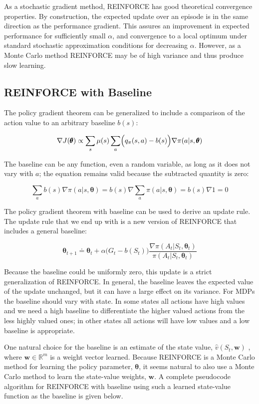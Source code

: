 \documentclass{article}
\begin{document}
As a stochastic gradient method, REINFORCE has good theoretical convergence properties. By construction, the expected update over an episode is in the same direction as the performance gradient. 
This assures an improvement in expected performance for sufficiently small $\alpha$, and convergence to a local optimum under standard stochastic approximation conditions for decreasing $\alpha$. 
However, as a Monte Carlo method REINFORCE may be of high variance and thus produce slow learning.

\subsection{REINFORCE with Baseline}

The policy gradient theorem can be generalized to include a comparison of the action value to an arbitrary baseline $b ( s )$:

$$
\nabla J ( \pmb { \theta } ) \propto \sum _ { s } \mu ( s ) \sum _ { a } \Bigl ( q _ { \pi } ( s , a ) - b ( s ) \Bigr ) \nabla \pi ( a | s , \pmb { \theta } )
$$

The baseline can be any function, even a random variable, as long as it does not vary with $a$; the equation remains valid because the subtracted quantity is zero:

$$
\sum _ { a } b ( s ) \nabla \pi ( a | s , \pmb { \theta } ) = b ( s ) \nabla \sum _ { a } \pi ( a | s , \pmb { \theta } ) = b ( s ) \nabla 1 = 0
$$

The policy gradient theorem with baseline can be used to derive an update rule. The update rule that we end up with is a new version of REINFORCE that includes a general baseline:

$$
\pmb { \theta } _ { t + 1 } \doteq \pmb { \theta } _ { t } + \alpha \Big ( G _ { t } - b ( S _ { t } ) \Big ) \frac { \nabla \pi ( A _ { t } | S _ { t } , \pmb { \theta } _ { t } ) } { \pi ( A _ { t } | S _ { t } , \pmb { \theta } _ { t } ) }
$$

Because the baseline could be uniformly zero, this update is a strict generalization of REINFORCE. In general, the baseline leaves the expected value of the update unchanged, but it can have a large effect on its variance. 
For MDPs the baseline should vary with state. In some states all actions have high values and we need a high baseline to differentiate the higher valued actions from the less highly valued ones; in other states all actions will have low values and a low baseline is appropriate.

One natural choice for the baseline is an estimate of the state value, $\hat { v } ( S _ { t } \mathbf { , } \mathbf { w } )$ , where $\mathbf { w } \in \mathbb { R } ^ { m }$ is a weight vector learned. 
Because REINFORCE is a Monte Carlo method for learning the policy parameter, $\pmb{ \theta }$, it seems natural to also use a Monte Carlo method to learn the state-value weights, $\mathbf { w }$. A complete pseudocode algorithm for REINFORCE with baseline 
using such a learned state-value function as the baseline is given below.
\end{document}
